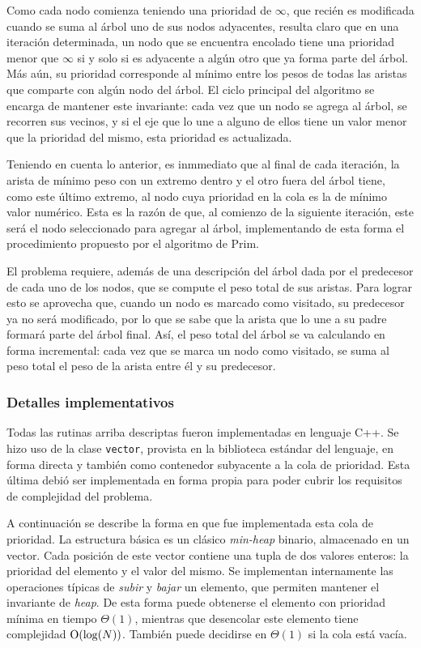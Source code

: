     Como cada nodo comienza teniendo una prioridad de $\infty$, que recién
    es modificada cuando se suma al árbol uno de sus nodos adyacentes,
    resulta claro que en una iteración determinada, un nodo que se encuentra
    encolado tiene una prioridad menor que $\infty$ si y solo si es adyacente
    a algún otro que ya forma parte del árbol. Más aún, su prioridad
    corresponde al mínimo entre los pesos de todas las aristas que comparte
    con algún nodo del árbol. El ciclo principal del algoritmo se encarga de
    mantener este invariante: cada vez que un nodo se agrega al árbol, se
    recorren sus vecinos, y si el eje que lo une a alguno de ellos tiene un
    valor menor que la prioridad del mismo, esta prioridad es actualizada.

    Teniendo en cuenta lo anterior, es inmmediato que al final de cada
    iteración, la arista de mínimo peso con un extremo dentro y el otro fuera
    del árbol tiene, como este último extremo, al nodo cuya prioridad en la
    cola es la de mínimo valor numérico. Esta es la razón de que, al comienzo
    de la siguiente iteración, este será el nodo seleccionado para agregar al
    árbol, implementando de esta forma el procedimiento propuesto por el
    algoritmo de Prim.

    El problema requiere, además de una descripción del árbol dada por el
    predecesor de cada uno de los nodos, que se compute el peso total de sus
    aristas. Para lograr esto se aprovecha que, cuando un nodo es marcado como
    visitado, su predecesor ya no será modificado, por lo que se sabe que
    la arista que lo une a su padre formará parte del árbol final. Así, el
    peso total del árbol se va calculando en forma incremental: cada
    vez que se marca un nodo como visitado, se suma al peso total el peso de
    la arista entre él y su predecesor.

    \subsubsection{Detalles implementativos}
    Todas las rutinas arriba descriptas fueron implementadas en lenguaje C++.
    Se hizo uso de la clase \texttt{vector}, provista en la biblioteca
    estándar del lenguaje, en forma directa y también como contenedor
    subyacente a la cola de prioridad. Esta última debió ser implementada en
    forma propia para poder cubrir los requisitos de complejidad del problema.

    A continuación se describe la forma en que fue implementada esta cola de
    prioridad. La estructura básica es un clásico
    \emph{min-heap} binario, almacenado en un vector. Cada posición de este
    vector contiene una tupla de dos valores enteros: la prioridad del
    elemento y el valor del mismo. Se implementan internamente las
    operaciones típicas de \emph{subir} y \emph{bajar} un elemento, que
    permiten mantener el invariante de \emph{heap}. De esta forma puede
    obtenerse el elemento con prioridad mínima en tiempo $\Theta(1)$,
    mientras que desencolar este elemento tiene complejidad $\operatorname{O}(\log(N))$.
    También puede decidirse en $\Theta(1)$ si la cola está vacía.

